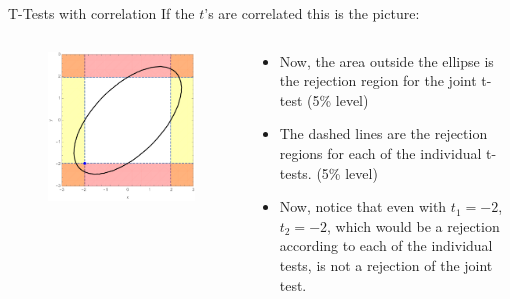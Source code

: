 \begin{frame}{T-Tests with correlation}
\vspace{3mm}If the $t$'s are correlated this is the picture:
\begin{columns}
\begin{column}{0.5\textwidth}
\begin{figure}	
	\includegraphics[width=.8\textwidth]{jointTtests2.pdf}	
\end{figure}
\end{column}
\begin{column}{0.5\textwidth}
\begin{itemize}
	\item Now, the area outside the ellipse is the rejection region for the joint t-test (5\% level)
	\item The dashed lines are the rejection regions for each of the individual t-tests.  (5\% level)
	\item Now, notice that even with $t_1 = -2$, $t_2=-2$, which would be a rejection according
	to each of the individual tests, is not a rejection of the joint test. 
\end{itemize}
\end{column}
\end{columns}

\end{frame}




